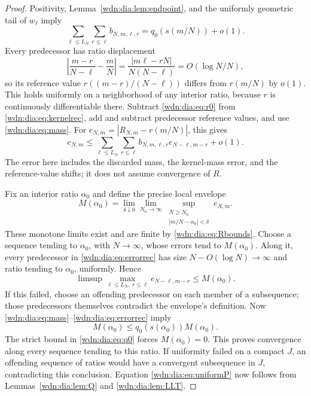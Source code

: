 \documentclass[11pt,letterpaper]{article}
\theoremstyle{remark}\newtheorem{remark}[theorem]{Remark}
\begin{document}
\begin{proof}
Positivity, Lemma~\ref{wdn:dia:lem:endpoint}, and the uniformly geometric tail of
$w_\ell$ imply
\begin{equation}\label{wdn:dia:eq:mass}
 \sum_{\ell\le L_N}\sum_{r\le\ell}b_{N,m,\ell,r}
 =q_0(s(m/N))+o(1).
\end{equation}
Every predecessor has ratio displacement
\[
 \left|\frac{m-r}{N-\ell}-\frac mN\right|
 =\frac{|m\ell-rN|}{N(N-\ell)}=O(\log N/N),
\]
so its reference value $r((m-r)/(N-\ell))$ differs from $r(m/N)$ by $o(1)$.
This holds uniformly on a neighborhood of any interior ratio, because $r$
is continuously differentiable there. Subtract \eqref{wdn:dia:eq:r0} from
\eqref{wdn:dia:eq:kernelrec}, add and subtract predecessor reference values, and
use \eqref{wdn:dia:eq:mass}. For $e_{N,m}=|R_{N,m}-r(m/N)|$, this gives
\begin{equation}\label{wdn:dia:eq:errorrec}
 e_{N,m}\le\sum_{\ell\le L_N}\sum_{r\le\ell}
 b_{N,m,\ell,r}e_{N-\ell,m-r}+o(1).
\end{equation}
The error here includes the discarded mass, the kernel-mass error, and the
reference-value shifts; it does not assume convergence of $R$.

Fix an interior ratio $\alpha_0$ and define the precise local envelope
\begin{equation}\label{wdn:dia:eq:envelope}
 M(\alpha_0)=\lim_{\delta\downarrow0}\lim_{N_0\to\infty}
 \sup_{\substack{N\ge N_0\\|m/N-\alpha_0|<\delta}}
 e_{N,m}.
\end{equation}
These monotone limits exist and are finite by \eqref{wdn:dia:eq:Rbounds}. Choose a
sequence tending to $\alpha_0$, with $N\to\infty$, whose errors tend to
$M(\alpha_0)$. Along it, every predecessor in \eqref{wdn:dia:eq:errorrec} has size
$N-O(\log N)\to\infty$ and ratio tending to $\alpha_0$, uniformly. Hence
\[
 \limsup\max_{\ell\le L_N,\ r\le\ell}e_{N-\ell,m-r}\le M(\alpha_0).
\]
If this failed, choose an offending predecessor on each member of a
subsequence; those predecessors themselves contradict the envelope's
definition. Now \eqref{wdn:dia:eq:mass}--\eqref{wdn:dia:eq:errorrec} imply
\[
 M(\alpha_0)\le q_0(s(\alpha_0))M(\alpha_0).
\]
The strict bound in \eqref{wdn:dia:eq:q0} forces $M(\alpha_0)=0$. This proves
convergence along every sequence tending to this ratio. If uniformity
failed on a compact $J$, an offending sequence of ratios would have a
convergent subsequence in $J$, contradicting this conclusion. Equation
\eqref{wdn:dia:eq:uniformP} now follows from Lemmas~\ref{wdn:dia:lem:Q} and \ref{wdn:dia:lem:LLT}.
\end{proof}
\end{document}
